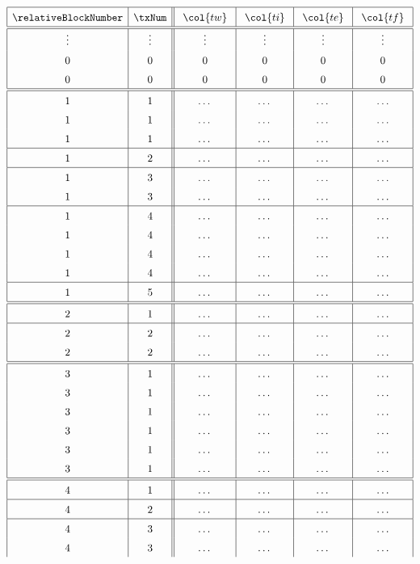 \begin{figure}
\centering
\[
\renewcommand{\arraystretch}{1.5}
\begin{array}{|c|c||c|c|c|c|}
	\hline
	\relativeBlockNumber & \txNum & ~ \col{tw} ~ & ~ \col{ti} ~ & ~ \col{te} ~ & ~ \col{tf} ~\\
	\hline\hline
	\vdots & \vdots & \vdots & \vdots & \vdots & \vdots \\
	0 & 0 & 0 & 0 & 0 & 0 \\
	0 & 0 & 0 & 0 & 0 & 0 \\
	\hline\hline
	1 & 1 & \dots & \dots & \dots & \dots \\
	1 & 1 & \dots & \dots & \dots & \dots \\
	1 & 1 & \dots & \dots & \dots & \dots \\
	\hline
	1 & 2 & \dots & \dots & \dots & \dots \\
	\hline
	1 & 3 & \dots & \dots & \dots & \dots \\
	1 & 3 & \dots & \dots & \dots & \dots \\
	\hline
	1 & 4 & \dots & \dots & \dots & \dots \\
	1 & 4 & \dots & \dots & \dots & \dots \\
	1 & 4 & \dots & \dots & \dots & \dots \\
	1 & 4 & \dots & \dots & \dots & \dots \\
	\hline
	1 & 5 & \dots & \dots & \dots & \dots \\
	\hline\hline
	2 & 1 & \dots & \dots & \dots & \dots \\
	\hline
	2 & 2 & \dots & \dots & \dots & \dots \\
	2 & 2 & \dots & \dots & \dots & \dots \\
	\hline\hline
	3 & 1 & \dots & \dots & \dots & \dots \\
	3 & 1 & \dots & \dots & \dots & \dots \\
	3 & 1 & \dots & \dots & \dots & \dots \\
	3 & 1 & \dots & \dots & \dots & \dots \\
	3 & 1 & \dots & \dots & \dots & \dots \\
	3 & 1 & \dots & \dots & \dots & \dots \\
	\hline\hline
	4 & 1 & \dots & \dots & \dots & \dots \\
	\hline
	4 & 2 & \dots & \dots & \dots & \dots \\
	\hline
	4 & 3 & \dots & \dots & \dots & \dots \\
	4 & 3 & \dots & \dots & \dots & \dots \\

\end{array}\]
\end{figure}
